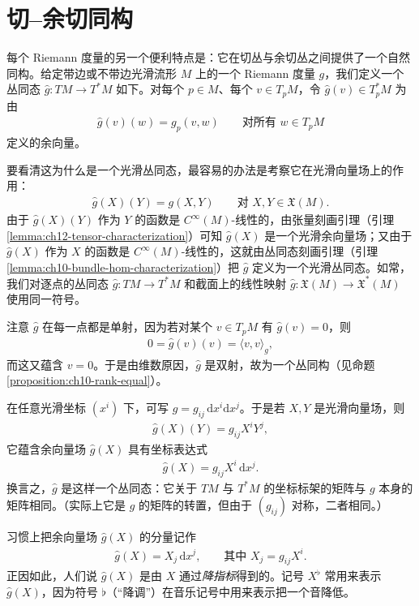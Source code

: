 \documentclass[../../main.tex]{subfiles}
\begin{document}
\section{切--余切同构}\label{section:ch13-tangent-cotangent}

每个 Riemann 度量的另一个便利特点是：它在切丛与余切丛之间提供了一个自然同构。给定带边或不带边光滑流形 $M$ 上的一个 Riemann 度量 $g$，我们定义一个丛同态 $\hat g:TM\to T^*M$ 如下。对每个 $p\in M$、每个 $v\in T_pM$，令 $\hat g(v)\in T_p^*M$ 为由
\begin{align*}
\hat g(v)(w)=g_p(v,w)\qquad\text{对所有 }w\in T_pM
\end{align*}
定义的余向量。

要看清这为什么是一个光滑丛同态，最容易的办法是考察它在光滑向量场上的作用：
\begin{align*}
\hat g(X)(Y)=g(X,Y)\qquad\text{对 }X,Y\in\mathfrak X(M).
\end{align*}
由于 $\hat g(X)(Y)$ 作为 $Y$ 的函数是 $C^\infty(M)$-线性的，由张量刻画引理（引理\ref{lemma:ch12-tensor-characterization}）可知 $\hat g(X)$ 是一个光滑余向量场；又由于 $\hat g(X)$ 作为 $X$ 的函数是 $C^\infty(M)$-线性的，这就由丛同态刻画引理（引理\ref{lemma:ch10-bundle-hom-characterization}）把 $\hat g$ 定义为一个光滑丛同态。如常，我们对逐点的丛同态 $\hat g:TM\to T^*M$ 和截面上的线性映射 $\hat g:\mathfrak X(M)\to\mathfrak X^*(M)$ 使用同一符号。

注意 $\hat g$ 在每一点都是单射，因为若对某个 $v\in T_pM$ 有 $\hat g(v)=0$，则
\begin{align*}
0=\hat g(v)(v)=\langle v,v\rangle_g,
\end{align*}
而这又蕴含 $v=0$。于是由维数原因，$\hat g$ 是双射，故为一个丛同构（见命题\ref{proposition:ch10-rank-equal}）。

在任意光滑坐标 $(x^i)$ 下，可写 $g=g_{ij}\,\mathrm{d}x^i\mathrm{d}x^j$。于是若 $X,Y$ 是光滑向量场，则
\begin{align*}
\hat g(X)(Y)=g_{ij}X^iY^j,
\end{align*}
它蕴含余向量场 $\hat g(X)$ 具有坐标表达式
\begin{align*}
\hat g(X)=g_{ij}X^i\,\mathrm{d}x^j.
\end{align*}
换言之，$\hat g$ 是这样一个丛同态：它关于 $TM$ 与 $T^*M$ 的坐标标架的矩阵与 $g$ 本身的矩阵相同。（实际上它是 $g$ 的矩阵的转置，但由于 $(g_{ij})$ 对称，二者相同。）

习惯上把余向量场 $\hat g(X)$ 的分量记作
\begin{align*}
\hat g(X)=X_j\,\mathrm{d}x^j,
\qquad\text{其中 }X_j=g_{ij}X^i.
\end{align*}
正因如此，人们说 $\hat g(X)$ 是由 $X$ 通过\emph{降指标}得到的。记号 $X^\flat$ 常用来表示 $\hat g(X)$，因为符号 $\flat$（“降调”）在音乐记号中用来表示把一个音降低。
\end{document}
